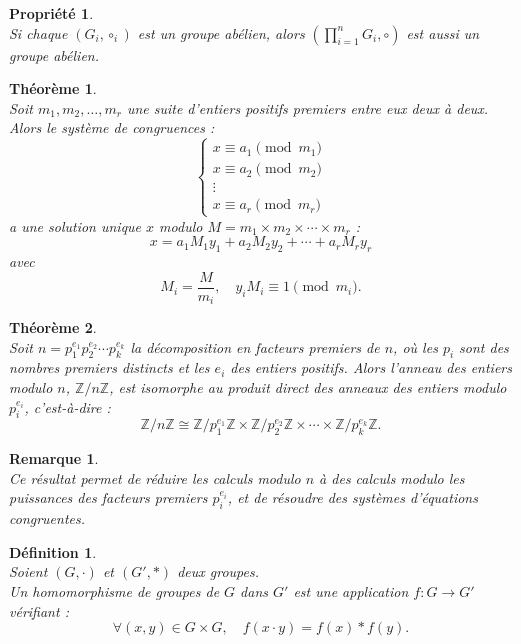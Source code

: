 \documentclass[a4paper, 14pt]{report}
\newtheorem{definition}{Définition}[section]
\newtheorem{remark}{Remarque}[section]
\newtheorem{propriety}{Propriété}[section]
\newtheorem{theorem}{Théorème}[section]
\begin{document}
\begin{onehalfspace}
{\begin{propriety} \cite{schaub1997} \\
Si chaque \( (G_i, \circ_i) \) est un groupe abélien, alors \( \left( \prod_{i=1}^{n} G_i, \circ \right) \) est aussi un groupe abélien.
\end{propriety}


\begin{theorem} \cite{pei1996chinese} \\
Soit $m_1, m_2, \ldots, m_r$ une suite d'entiers positifs premiers entre eux deux à deux. Alors le système de congruences :
	\[
	\begin{cases}
		x \equiv a_1 \pmod{m_1} \\
		x \equiv a_2 \pmod{m_2} \\
		\vdots \\
		x \equiv a_r \pmod{m_r}
	\end{cases}
	\]
	a une solution unique $x$ modulo $M = m_1 \times m_2 \times \cdots \times m_r$ :
	\[
	x = a_1 M_1 y_1 + a_2 M_2 y_2 + \cdots + a_r M_r y_r
	\]
	avec
	\[
	M_i = \frac{M}{m_i}, \quad y_i M_i \equiv 1 \pmod{m_i}.
	\]
\end{theorem}



\begin{theorem} \cite{schwarzweller2009chinese} \\
Soit \( n = p_1^{e_1} p_2^{e_2} \cdots p_k^{e_k} \) la décomposition en facteurs premiers de \( n \), où les \( p_i \) sont des nombres premiers distincts et les \( e_i \) des entiers positifs. Alors l'anneau des entiers modulo \( n \), \( \mathbb{Z}/n\mathbb{Z} \), est isomorphe au produit direct des anneaux des entiers modulo \( p_i^{e_i} \), c'est-à-dire :
	\[
	\mathbb{Z}/n\mathbb{Z} \cong \mathbb{Z}/p_1^{e_1}\mathbb{Z} \times \mathbb{Z}/p_2^{e_2}\mathbb{Z} \times \cdots \times \mathbb{Z}/p_k^{e_k}\mathbb{Z}.
	\]	
\end{theorem}

\begin{remark} \cite{schwarzweller2009chinese} \\
Ce résultat permet de réduire les calculs modulo \( n \) à des calculs modulo les puissances des facteurs premiers \( p_i^{e_i} \), et de résoudre des systèmes d'équations congruentes.
\end{remark}


\begin{definition} \cite{schaub1997} \\
Soient $(G, \cdot)$ et $(G', *)$ deux groupes.\\
Un homomorphisme de groupes de $G$ dans $G'$ est une application $f : G \rightarrow G'$ vérifiant :
	\[
	\forall (x, y) \in G \times G, \quad f(x \cdot y) = f(x) * f(y).
	\]
\end{definition}

}
\end{onehalfspace}
\end{document}
